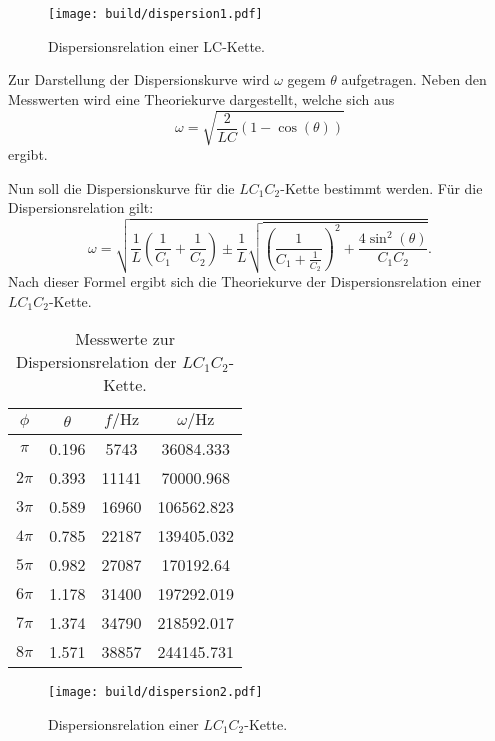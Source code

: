 \begin{figure}
  \centering
  \texttt{[image: build/dispersion1.pdf]}
\caption{Dispersionsrelation einer LC-Kette.}
  \label{fig:dispersion-lc}
\end{figure}

Zur Darstellung der Dispersionskurve wird $\omega$ gegem $\theta$ aufgetragen. Neben den Messwerten wird eine Theoriekurve dargestellt, welche sich aus
\begin{equation}
  \omega = \sqrt{\frac{2}{LC}(1-\cos(\theta))}
\end{equation}
ergibt.

 Nun soll die Dispersionskurve für die $LC_{1}C_{2}$-Kette bestimmt werden.
 Für die Dispersionsrelation gilt:
 \begin{equation}
  \omega = \sqrt{\frac{1}{L}\left(\frac{1}{C_{1}}+\frac{1}{C_{2}}\right)\pm\frac{1}{L}\sqrt{\left(\frac{1}{C_{1}+\frac{1}{C_2}}\right)^2 + \frac{4\sin^2(\theta)}{C_{1}C_{2}}}}.
  \end{equation}
  Nach dieser Formel ergibt sich die Theoriekurve der Dispersionsrelation einer $LC_{1}C_{2}$-Kette.

\begin{table}
  \centering
  \caption{Messwerte zur Dispersionsrelation der $LC_{1}C_{2}$-Kette.}
  \label{tab:dispersion1}
  \begin{tabular}{c c c c}
    \toprule
    $\phi$ & $\theta$ & $f / \si{\hertz}$ & $\omega / \si{\hertz}$ \\
    \midrule
    $\pi$ & 0.196 & 5743 & 36084.333 \\
    $2\pi$ & 0.393 & 11141 & 70000.968 \\
    $3\pi$ & 0.589 & 16960 & 106562.823 \\
    $4\pi$ & 0.785 & 22187 & 139405.032 \\
    $5\pi$ & 0.982 & 27087 & 170192.64 \\
    $6\pi$ & 1.178 & 31400 & 197292.019 \\
    $7\pi$ & 1.374 & 34790 & 218592.017 \\
    $8\pi$ & 1.571 & 38857 & 244145.731 \\
    \bottomrule
    \end{tabular}
  \end{table}

  \begin{figure}
    \centering
    \texttt{[image: build/dispersion2.pdf]}
  \caption{Dispersionsrelation einer $LC_{1}C_{2}$-Kette.}
    \label{fig:dispersion-lc1c2}
  \end{figure}

